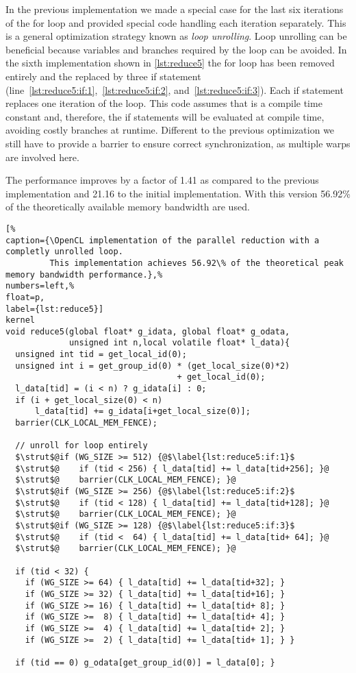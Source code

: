 In the previous implementation we made a special case for the last six iterations of the for loop and provided special code handling each iteration separately.
This is a general optimization strategy known as \emph{loop unrolling}.
Loop unrolling can be beneficial because variables and branches required by the loop can be avoided.
In the sixth implementation shown in \autoref{lst:reduce5} the for loop has been removed entirely and the replaced by three if statement (line~\ref{lst:reduce5:if:1},~\ref{lst:reduce5:if:2}, and~\ref{lst:reduce5:if:3}).
Each if statement replaces one iteration of the loop.
This code assumes that  is a compile time constant and, therefore, the if statements will be evaluated at compile time, avoiding costly branches at runtime.
Different to the previous optimization we still have to provide a barrier to ensure correct synchronization, as multiple warps are involved here.

The performance improves by a factor of 1.41 as compared to the previous implementation and 21.16 to the initial implementation.
With this version 56.92\% of the theoretically available memory bandwidth are used.

\begin{lstlisting}[%                                                             
caption={\OpenCL implementation of the parallel reduction with a completly unrolled loop.
         This implementation achieves 56.92\% of the theoretical peak memory bandwidth performance.},%
numbers=left,%
float=p,
label={lst:reduce5}]
kernel
void reduce5(global float* g_idata, global float* g_odata,
             unsigned int n,local volatile float* l_data){
  unsigned int tid = get_local_id(0);
  unsigned int i = get_group_id(0) * (get_local_size(0)*2)
                                   + get_local_id(0);
  l_data[tid] = (i < n) ? g_idata[i] : 0;
  if (i + get_local_size(0) < n) 
      l_data[tid] += g_idata[i+get_local_size(0)];  
  barrier(CLK_LOCAL_MEM_FENCE);

  // unroll for loop entirely
  $\strut$@if (WG_SIZE >= 512) {@$\label{lst:reduce5:if:1}$
  $\strut$@    if (tid < 256) { l_data[tid] += l_data[tid+256]; }@
  $\strut$@    barrier(CLK_LOCAL_MEM_FENCE); }@
  $\strut$@if (WG_SIZE >= 256) {@$\label{lst:reduce5:if:2}$
  $\strut$@    if (tid < 128) { l_data[tid] += l_data[tid+128]; }@
  $\strut$@    barrier(CLK_LOCAL_MEM_FENCE); }@
  $\strut$@if (WG_SIZE >= 128) {@$\label{lst:reduce5:if:3}$
  $\strut$@    if (tid <  64) { l_data[tid] += l_data[tid+ 64]; }@
  $\strut$@    barrier(CLK_LOCAL_MEM_FENCE); }@
  
  if (tid < 32) {
    if (WG_SIZE >= 64) { l_data[tid] += l_data[tid+32]; }
    if (WG_SIZE >= 32) { l_data[tid] += l_data[tid+16]; }
    if (WG_SIZE >= 16) { l_data[tid] += l_data[tid+ 8]; }
    if (WG_SIZE >=  8) { l_data[tid] += l_data[tid+ 4]; }
    if (WG_SIZE >=  4) { l_data[tid] += l_data[tid+ 2]; }
    if (WG_SIZE >=  2) { l_data[tid] += l_data[tid+ 1]; } }
  
  if (tid == 0) g_odata[get_group_id(0)] = l_data[0]; }
\end{lstlisting}


